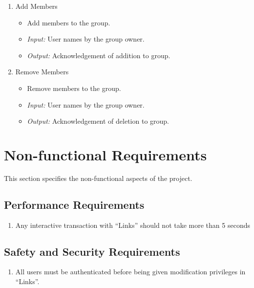 \documentclass[11pt]{report} %
\begin{document}
\begin{enumerate}
	\item
		Add Members
		\begin{itemize}
			\item
				Add members to the group.
			\item
				\emph{Input:} User names by the group owner.
			\item
				\emph{Output:} Acknowledgement of addition to group.
		\end{itemize}


	\item
		Remove Members
		\begin{itemize}
			\item
				Remove members to the group.
			\item
				\emph{Input:} User names by the group owner.
			\item
				\emph{Output:} Acknowledgement of deletion to group.
		\end{itemize}
\end{enumerate}
\maketitle
\chapter{Non-functional Requirements}
This section specifies the non-functional aspects of the project.
\section{Performance Requirements}
\begin{enumerate}
\item
Any interactive transaction with “Links” should not take more than 5 seconds
\end{enumerate}
\section{Safety and Security Requirements}
\begin{enumerate}
\item
All users must be authenticated before being given modification privileges in “Links”.
\end{enumerate}
\end{document}
